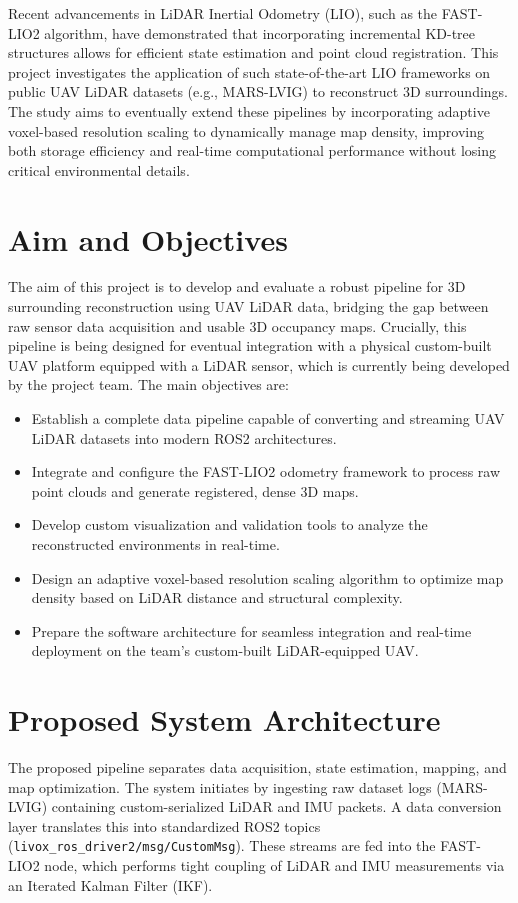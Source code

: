 \documentclass[11pt,a4paper]{article}
\begin{document}
Recent advancements in LiDAR Inertial Odometry (LIO), such as the FAST-LIO2 algorithm, have demonstrated that incorporating incremental KD-tree structures allows for efficient state estimation and point cloud registration. This project investigates the application of such state-of-the-art LIO frameworks on public UAV LiDAR datasets (e.g., MARS-LVIG) to reconstruct 3D surroundings. The study aims to eventually extend these pipelines by incorporating adaptive voxel-based resolution scaling to dynamically manage map density, improving both storage efficiency and real-time computational performance without losing critical environmental details.

\section*{Aim and Objectives}
The aim of this project is to develop and evaluate a robust pipeline for 3D surrounding reconstruction using UAV LiDAR data, bridging the gap between raw sensor data acquisition and usable 3D occupancy maps. Crucially, this pipeline is being designed for eventual integration with a physical custom-built UAV platform equipped with a LiDAR sensor, which is currently being developed by the project team. 
The main objectives are:
\begin{itemize}
    \item Establish a complete data pipeline capable of converting and streaming UAV LiDAR datasets into modern ROS2 architectures.
    \item Integrate and configure the FAST-LIO2 odometry framework to process raw point clouds and generate registered, dense 3D maps.
    \item Develop custom visualization and validation tools to analyze the reconstructed environments in real-time.
    \item Design an adaptive voxel-based resolution scaling algorithm to optimize map density based on LiDAR distance and structural complexity.
    \item Prepare the software architecture for seamless integration and real-time deployment on the team's custom-built LiDAR-equipped UAV.
\end{itemize}

\section*{Proposed System Architecture}
The proposed pipeline separates data acquisition, state estimation, mapping, and map optimization. 
The system initiates by ingesting raw dataset logs (MARS-LVIG) containing custom-serialized LiDAR and IMU packets. A data conversion layer translates this into standardized ROS2 topics (\texttt{livox\_ros\_driver2/msg/CustomMsg}). These streams are fed into the FAST-LIO2 node, which performs tight coupling of LiDAR and IMU measurements via an Iterated Kalman Filter (IKF). 
\end{document}
